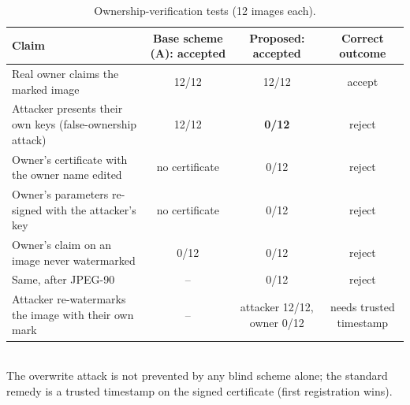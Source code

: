 \begin{table}[t]
\centering
\small
\caption{Ownership-verification tests (12 images each).}
\begin{tabular}{lccc}
\toprule
Claim & Base scheme (A): accepted & Proposed: accepted & Correct outcome \\
\midrule
Real owner claims the marked image & 12/12 & 12/12 & accept \\
Attacker presents their own keys (false-ownership attack) & 12/12 & \textbf{0/12} & reject \\
Owner's certificate with the owner name edited & no certificate & 0/12 & reject \\
Owner's parameters re-signed with the attacker's key & no certificate & 0/12 & reject \\
Owner's claim on an image never watermarked & 0/12 & 0/12 & reject \\
Same, after JPEG-90 & – & 0/12 & reject \\
Attacker re-watermarks the image with their own mark & – & attacker 12/12, owner 0/12 & needs trusted timestamp \\
\bottomrule
\end{tabular}
\\[2pt]\footnotesize The overwrite attack is not prevented by any blind scheme alone; the standard remedy is a trusted timestamp on the signed certificate (first registration wins).
\end{table}
